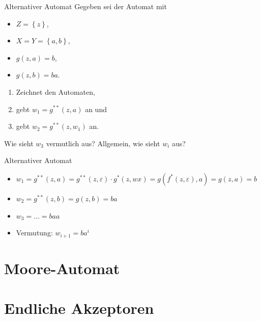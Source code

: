 \begin{frame}{Alternativer Automat}
    Gegeben sei der Automat mit
    \begin{itemize}
        \item $Z = \left\{ z \right\}$,
        \item $X = Y = \left\{ a, b \right\}$,
        \item $g\left( z, a \right) = b$,
        \item $g\left( z, b \right) = ba$.
     \end{itemize}
     \begin{enumerate}
         \item Zeichnet den Automaten,
         \item gebt $w_1 = g^{**}\left( z, a \right)$ an und
         \item gebt $w_2 = g^{**}\left( z, w_1 \right)$ an.
     \end{enumerate}
     Wie sieht $w_3$ vermutlich aus? Allgemein, wie sieht $w_i$ aus?
\end{frame}
\begin{frame}{Alternativer Automat}
    \begin{figure}
    \centering
    \end{figure}
    \begin{itemize}
        \item $w_1 = g^{**}\left( z, a \right) = g^{**}\left( z, \varepsilon \right)\cdot g^*\left( z, wx \right) = g\left( f^*\left( z, \varepsilon \right), a \right) = g\left( z, a \right) = b$
        \item $w_2 = g^{**}\left( z, b \right) = g\left( z, b \right) = ba$
        \item $w_3 = \dots = baa$
        \item Vermutung: $w_{i+1} = ba^i$
    \end{itemize}
\end{frame}

\section{Moore-Automat}

\section{Endliche Akzeptoren}

